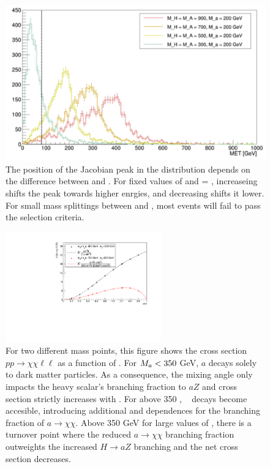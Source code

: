 \begin{figure}
\includegraphics[width=\textwidth]{texinputs/04_grid/figures/monoz/leptonic/mA_Scan.pdf}
\caption{The position of the Jacobian peak in the \MET distribution depends on the difference between \mH and \ma.  For fixed values of \ma and \mA = \mH, increaseing \mA shifts the peak towards higher enrgies, and decreasing \mA shifts it lower.  For small mass splittings between \mH and \ma, most events will fail to pass the \MET selection criteria.}   
\end{figure}

\begin{figure}
\includegraphics[width=0.6\textwidth]{texinputs/04_grid/figures/monoz/leptonic/SinThetaScan_xsecs.pdf}
\caption{For two different mass points, this figure shows the cross section $pp\rightarrow\chi\chi\ell\ell$ as a function of \sinp. 
For $M_{a} < 350$ GeV, $a$ decays solely to dark matter particles.  
As a consequence, the mixing angle only impacts the heavy scalar's branching fraction to $aZ$ and 
cross section strictly increases with \sinp.  
For \ma above 350 \GeV, \ttbar~ decays become accesible, introducing additional \sinp and \cosp dependences for the branching fraction 
of $a\rightarrow\chi\chi$.  Above 350 GeV for large values of \sinp, there is a turnover point where the reduced $a\rightarrow\chi\chi$ branching fraction outweights the increased $H \rightarrow aZ$ branching and the net cross section decreases.}
\end{figure}


